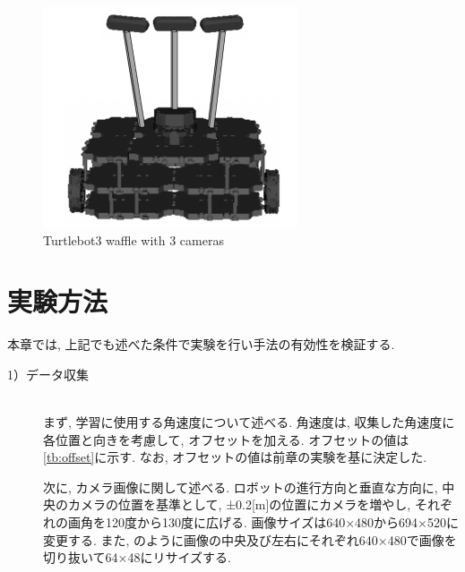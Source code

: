 \begin{figure}[h]
  \centering
  \includegraphics[keepaspectratio, scale=0.5]{images/turtlebot3.png}
  \caption{Turtlebot3 waffle with 3 cameras}
  \label{Fig:turtlebot3_3cam}
\end{figure}

\section{実験方法}
本章では, 上記でも述べた条件で実験を行い手法の有効性を検証する. 

\begin{description}
  \item[1）データ収集]\mbox{}\\ \hspace*{3mm}まず, 学習に使用する角速度について述べる. 角速度は, 収集した角速度に各位置と向きを考慮して, オフセットを加える. オフセットの値は\ref{tb:offset}に示す. なお, オフセットの値は前章の実験を基に決定した. \par \hspace*{3mm}次に, カメラ画像に関して述べる. ロボットの進行方向と垂直な方向に, 中央のカメラの位置を基準として, ±0.2[m]の位置にカメラを増やし, それぞれの画角を120度から130度に広げる. 画像サイズは640×480から694×520に変更する. また, のように画像の中央及び左右にそれぞれ640×480で画像を切り抜いて64×48にリサイズする. 
\end{description}

